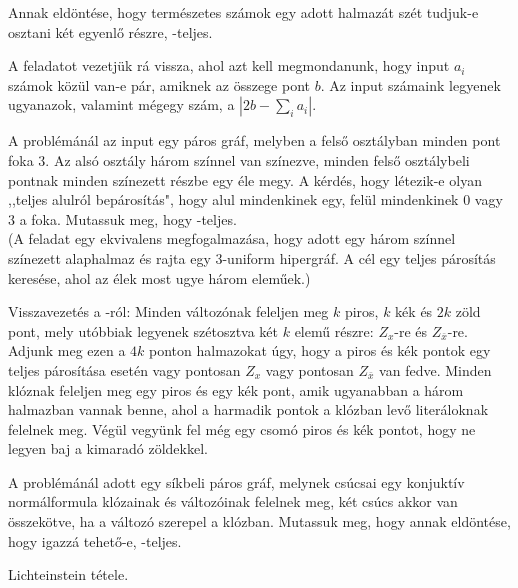 \begin{Exercise}[counter={sorszam}, difficulty=0]
	Annak eldöntése, hogy term\'eszetes sz\'amok egy adott halmaz\'at sz\'et tudjuk-e osztani k\'et egyenl\H o r\'eszre, \NP-teljes.
\end{Exercise}	
\begin{Answer}
	A  feladatot vezetj\"uk r\'a vissza, ahol azt kell megmondanunk, hogy input $a_i$ sz\'amok k\"oz\"ul van-e p\'ar, amiknek az \"osszege pont $b$. Az input sz\'amaink legyenek ugyanazok, valamint m\'egegy sz\'am, a $|2b-\sum_i a_i|.$
\end{Answer}


\begin{Exercise}[counter={sorszam}, difficulty=0]
	A  problémánál az input egy páros gráf, melyben a fels\H o osztályban minden pont foka $3$. Az alsó osztály három színnel van színezve, minden fels\H o osztálybeli pontnak minden színezett részbe egy éle megy. A kérdés, hogy létezik-e olyan ,,teljes alulról bepárosítás", hogy alul mindenkinek egy, felül mindenkinek $0$ vagy $3$ a foka. Mutassuk meg, hogy  \NP-teljes.\\
	(A feladat egy ekvivalens megfogalmaz\'asa, hogy adott egy h\'arom sz\'innel sz\'inezett alaphalmaz \'es rajta egy $3$-uniform hipergr\'af. A c\'el egy teljes p\'aros\'it\'as keres\'ese, ahol az \'elek most ugye h\'arom elem\H uek.)
\end{Exercise}	
\begin{Answer}
	Visszavezet\'es a -r\'ol: Minden v\'altoz\'onak feleljen meg $k$ piros, $k$ k\'ek \'es $2k$ z\"old pont, mely ut\'obbiak legyenek sz\'etosztva k\'et $k$ elem\H u r\'eszre: $Z_x$-re \'es $Z_{\bar x}$-re. Adjunk meg ezen a $4k$ ponton halmazokat \'ugy, hogy a piros \'es k\'ek pontok egy teljes p\'aros\'it\'asa eset\'en vagy pontosan $Z_x$ vagy pontosan $Z_{\bar x}$ van fedve. Minden kl\'oznak feleljen meg egy piros \'es egy k\'ek pont, amik ugyanabban a h\'arom halmazban vannak benne, ahol a harmadik pontok a kl\'ozban lev\H o liter\'aloknak felelnek meg. V\'eg\"ul vegy\"unk fel m\'eg egy csom\'o piros \'es k\'ek pontot, hogy ne legyen baj a kimarad\'o z\"oldekkel.
\end{Answer}



\begin{Exercise}[counter={sorszam}, difficulty=1]
	A  problémánál adott egy s\'ikbeli páros gráf, melynek csúcsai egy konjuktív normál\-for\-mu\-la klózainak és változóinak felelnek meg, két csúcs akkor van összekötve, ha a változó szerepel a klózban. Mutassuk meg, hogy annak eldöntése, hogy igazz\'a tehet\H o-e, \NP-teljes.
\end{Exercise}	
\begin{Answer}
	Lichteinstein t\'etele.
\end{Answer}



